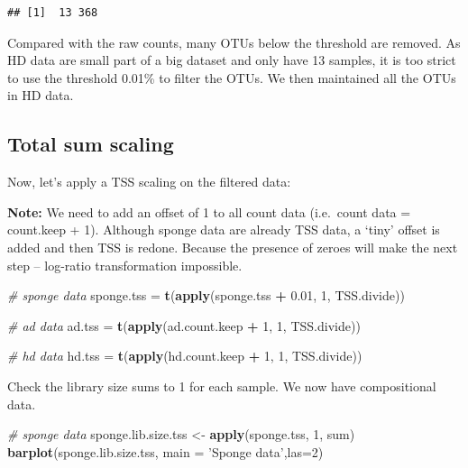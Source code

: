 \documentclass[]{book}
\newenvironment{Shaded}{\begin{snugshade}}{\end{snugshade}}
\newcommand{\KeywordTok}[1]{\textcolor[rgb]{0.13,0.29,0.53}{\textbf{#1}}}
\newcommand{\DataTypeTok}[1]{\textcolor[rgb]{0.13,0.29,0.53}{#1}}
\newcommand{\DecValTok}[1]{\textcolor[rgb]{0.00,0.00,0.81}{#1}}
\newcommand{\FloatTok}[1]{\textcolor[rgb]{0.00,0.00,0.81}{#1}}
\newcommand{\StringTok}[1]{\textcolor[rgb]{0.31,0.60,0.02}{#1}}
\newcommand{\CommentTok}[1]{\textcolor[rgb]{0.56,0.35,0.01}{\textit{#1}}}
\newcommand{\OperatorTok}[1]{\textcolor[rgb]{0.81,0.36,0.00}{\textbf{#1}}}
\newcommand{\NormalTok}[1]{#1}
\begin{document}
\begin{verbatim}
## [1]  13 368
\end{verbatim}

Compared with the raw counts, many OTUs below the threshold are removed.
As HD data are small part of a big dataset and only have 13 samples, it
is too strict to use the threshold 0.01\% to filter the OTUs. We then
maintained all the OTUs in HD data.

\subsection{Total sum scaling}\label{total-sum-scaling}

Now, let's apply a TSS scaling on the filtered data:

\textbf{Note:} We need to add an offset of 1 to all count data
(i.e.~count data = count.keep + 1). Although sponge data are already TSS
data, a `tiny' offset is added and then TSS is redone. Because the
presence of zeroes will make the next step -- log-ratio transformation
impossible.

\begin{Shaded}
\begin{Highlighting}[]
\CommentTok{# sponge data}
\NormalTok{sponge.tss =}\StringTok{ }\KeywordTok{t}\NormalTok{(}\KeywordTok{apply}\NormalTok{(sponge.tss }\OperatorTok{+}\StringTok{ }\FloatTok{0.01}\NormalTok{, }\DecValTok{1}\NormalTok{, TSS.divide))}

\CommentTok{# ad data}
\NormalTok{ad.tss =}\StringTok{ }\KeywordTok{t}\NormalTok{(}\KeywordTok{apply}\NormalTok{(ad.count.keep }\OperatorTok{+}\StringTok{ }\DecValTok{1}\NormalTok{, }\DecValTok{1}\NormalTok{, TSS.divide))}

\CommentTok{# hd data}
\NormalTok{hd.tss =}\StringTok{ }\KeywordTok{t}\NormalTok{(}\KeywordTok{apply}\NormalTok{(hd.count.keep }\OperatorTok{+}\StringTok{ }\DecValTok{1}\NormalTok{, }\DecValTok{1}\NormalTok{, TSS.divide))}
\end{Highlighting}
\end{Shaded}

Check the library size sums to 1 for each sample. We now have
compositional data.

\begin{Shaded}
\begin{Highlighting}[]
\CommentTok{# sponge data}
\NormalTok{sponge.lib.size.tss <-}\StringTok{ }\KeywordTok{apply}\NormalTok{(sponge.tss, }\DecValTok{1}\NormalTok{, sum)}
\KeywordTok{barplot}\NormalTok{(sponge.lib.size.tss, }\DataTypeTok{main =}  \StringTok{'Sponge data'}\NormalTok{,}\DataTypeTok{las=}\DecValTok{2}\NormalTok{)}
\end{Highlighting}
\end{Shaded}
\end{document}
